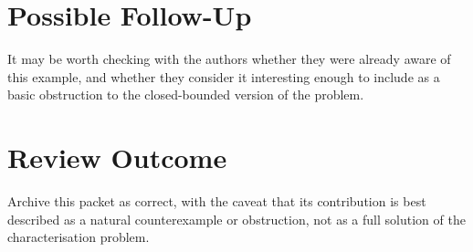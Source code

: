 \documentclass[11pt]{article}
\begin{document}
\section*{Possible Follow-Up}

It may be worth checking with the authors whether they were already aware of
this example, and whether they consider it interesting enough to include as a
basic obstruction to the closed-bounded version of the problem.

\section*{Review Outcome}

Archive this packet as correct, with the caveat that its contribution is best
described as a natural counterexample or obstruction, not as a full solution
of the characterisation problem.
\end{document}
